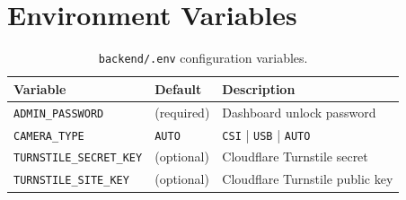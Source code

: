 \documentclass[12pt,a4paper]{article}
\begin{document}
\section{Environment Variables}

\begin{table}[H]
\centering
\caption{\texttt{backend/.env} configuration variables.}
\begin{tabular}{@{}lll@{}}
\toprule
\textbf{Variable}          & \textbf{Default}    & \textbf{Description} \\
\midrule
\texttt{ADMIN\_PASSWORD}   & (required)          & Dashboard unlock password \\
\texttt{CAMERA\_TYPE}      & \texttt{AUTO}       & \texttt{CSI} | \texttt{USB} | \texttt{AUTO} \\
\texttt{TURNSTILE\_SECRET\_KEY} & (optional)     & Cloudflare Turnstile secret \\
\texttt{TURNSTILE\_SITE\_KEY}   & (optional)     & Cloudflare Turnstile public key \\
\bottomrule
\end{tabular}
\end{table}
\end{document}
